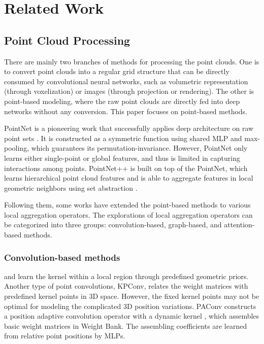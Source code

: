 \documentclass[lettersize,journal]{IEEEtran}
\begin{document}
\section{Related Work}

\subsection{Point Cloud Processing}
There are mainly two branches of methods for processing the point clouds. One is to convert 
point clouds into a regular grid structure that can be
directly consumed by convolutional neural networks, such as volumetric 
representation\cite{voxelnet,voxnet,octnet} (through voxelization) or images\cite{mvcnn,simpleview} 
(through projection or rendering). 
The other is point-based modeling, 
where the raw point clouds are directly fed into
deep networks without any conversion. This paper focuses on point-based methods.

PointNet is a pioneering work that successfully applies deep architecture on raw point sets \cite{pointnet}. 
It is constructed as a symmetric function using shared MLP\add{)} and max-pooling, 
which guarantees its permutation-invariance. However, PointNet only learns either 
single-point or global features, and thus is limited in capturing interactions among points.
PointNet++ is built on top of the PointNet, which learns hierarchical point cloud features 
and is able to aggregate features in local geometric neighbors using set abstraction \cite{pointnet2} . 

Following them, some works have extended the point-based methods to various local 
aggregation operators. The explorations of local aggregation operators can 
be categorized into three groups: convolution-based\cite{pointcnn,pointconv,pointweb,rscnn,pospool,spidercnn,kpconv,paconv}, graph-based\cite{sonet,dgcnn,specgcn,curvenet}, and attention-based\cite{gdanet,pct,pointtransformer,rpnet,scfnet} methods. 

\subsubsection*{\bf Convolution-based methods}
\cite{rscnn} and \cite{pospool} learn the kernel within a local region through predefined geometric priors. 
Another type of point convolutions, KPConv\cite{kpconv}, relates the weight matrices with predefined kernel points in 3D space.
However, the fixed kernel points may not be optimal for modeling the complicated 3D position variations. 
PAConv constructs a position adaptive convolution operator with a dynamic kernel \cite{paconv}, which assembles basic weight matrices in Weight Bank. 
The assembling coefficients are learned from relative point positions by MLPs.
\end{document}
